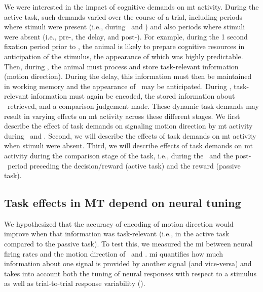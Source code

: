 We were interested in the impact of cognitive demands on \gls{mt} activity. During the active task, such demands varied over the course of a trial, including periods where stimuli were present (i.e., during \sample\ and \test) and also periods where stimuli were absent (i.e., pre-\sample, the delay, and post-\test). 
For example, during the 1 second fixation period prior to \sample, the animal is likely to prepare cognitive resources in anticipation of the stimulus, the appearance of which was highly predictable. Then, during \sample, the animal must process and store task-relevant information (motion direction). During the delay, this information must then be maintained in working memory and the appearance of \test\ may be anticipated. During \test, task-relevant information must again be encoded, the stored information about \sample\ retrieved, and a comparison judgement made. These dynamic task demands may result in varying effects on \gls{mt} activity across these different stages. We first describe the effect of task demands on signaling motion direction by \gls{mt} activity during \sample\ and \test. Second, we will describe the effects of task demands on \gls{mt} activity when stimuli were absent. 
Third, we will describe effects of task demands on \gls{mt} activity during the comparison stage of the task, i.e., during the \test\ and the post-\test\ period preceding the decision/reward (active task) and the reward (passive task).

\subsection*{Task effects in MT depend on neural tuning}
We hypothesized that the accuracy of encoding of motion direction would improve when that information was task-relevant (i.e., in the active task compared to the passive task).
To test this, we measured the \gls{mi} between neural firing rates and the motion direction of \sample\ and \test. \Gls{mi} quantifies how much information about one signal is provided by another signal (and vice-versa) and takes into account both the tuning of neural responses with respect to a stimulus as well as trial-to-trial response variability (\cite{Hatsopoulos1998, QuianQuiroga2009}).


